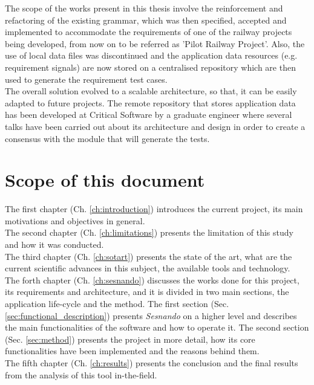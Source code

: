 The scope of the works present in this thesis involve the reinforcement and refactoring of the existing grammar, which was then specified, accepted and implemented to accommodate the requirements of one of the railway projects being developed, from now on to be referred as 'Pilot Railway Project'. Also, the use of  local data files was discontinued and the application data resources (e.g. requirement signals) are now stored on a centralised repository which are then used to generate the requirement test cases.\\

The overall solution evolved to a scalable architecture, so that, it can be easily adapted to future projects.
The remote repository that stores application data has been developed at Critical Software by a graduate engineer where several talks have been carried out about its architecture and design in order to create a consensus with the module that will generate the tests.



\section{Scope of this document}
\label{sec:document_scope}

The first chapter (Ch. \ref{ch:introduction}) introduces the current project, its main motivations and objectives in general.\\
The second chapter (Ch. \ref{ch:limitations}) presents the limitation of this study and how it was conducted.\\
The third chapter (Ch. \ref{ch:sotart}) presents the state of the art, what are the current scientific advances in this subject, the available tools and technology.\\
The forth chapter (Ch. \ref{ch:sesnando}) discusses the works done for this project, its requirements and architecture, and it is divided in two main sections, the application life-cycle and the method. The first section (Sec. \ref{sec:functional_description}) presents \textit{Sesnando} on a higher level and describes the main functionalities of the software and how to operate it. The second section (Sec. \ref{sec:method}) presents the project in more detail, how its core functionalities have been implemented and the reasons behind them.\\
The fifth chapter (Ch. \ref{ch:results}) presents the conclusion and the final results from the analysis of this tool in-the-field.
